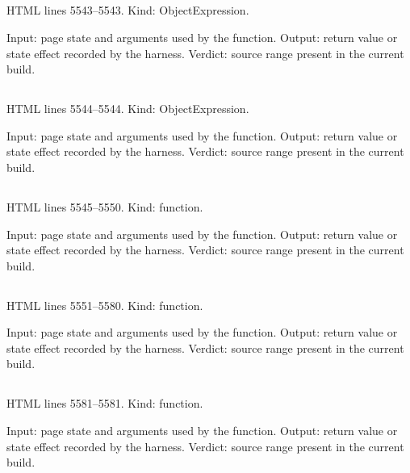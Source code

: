 \subsection*{\texttt{}}
\label{vf_242_GRAPH_METRICS}
HTML lines 5543--5543. Kind: ObjectExpression.

Input: page state and arguments used by the function.
Output: return value or state effect recorded by the harness.
Verdict: source range present in the current build.

\subsection*{\texttt{}}
\label{vf_243_GRAPH_STATE}
HTML lines 5544--5544. Kind: ObjectExpression.

Input: page state and arguments used by the function.
Output: return value or state effect recorded by the harness.
Verdict: source range present in the current build.

\subsection*{\texttt{}}
\label{vf_244_graphContext}
HTML lines 5545--5550. Kind: function.

Input: page state and arguments used by the function.
Output: return value or state effect recorded by the harness.
Verdict: source range present in the current build.

\subsection*{\texttt{}}
\label{vf_245_renderGraphs}
HTML lines 5551--5580. Kind: function.

Input: page state and arguments used by the function.
Output: return value or state effect recorded by the harness.
Verdict: source range present in the current build.

\subsection*{\texttt{}}
\label{vf_246_graphFileBase}
HTML lines 5581--5581. Kind: function.

Input: page state and arguments used by the function.
Output: return value or state effect recorded by the harness.
Verdict: source range present in the current build.

